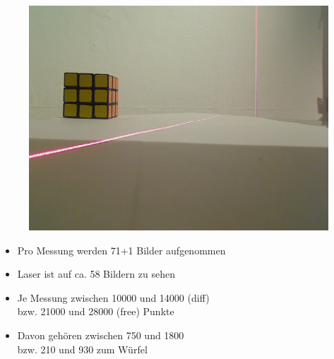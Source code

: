 \documentclass[xcolor=dvipsnames]{beamer}
\begin{document}
\begin{frame}
\begin{figure}
\begin{minipage}{0.32\linewidth}
			\includegraphics[width=\linewidth]{includes/test_repeat_3}
		\end{minipage}
	\end{figure}
	
	\begin{itemize}
		\item Pro Messung werden 71+1 Bilder aufgenommen
		\item Laser ist auf ca. 58 Bildern zu sehen
		\item Je Messung zwischen 10000 und 14000 (diff) \\ bzw. 21000 und 28000 (free) Punkte
		\item Davon gehören zwischen 750 und 1800 \\ bzw. 210 und 930 zum Würfel
	\end{itemize}


\end{frame}
\end{document}
